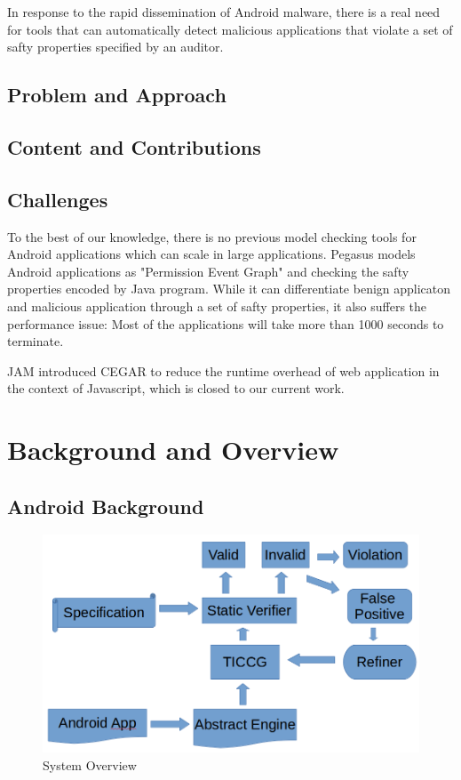 \documentclass{article}
\begin{document}
In response to the  rapid dissemination of 
Android malware, there is  a real need for tools that can automatically
detect malicious applications that violate a set of safty properties 
specified by an auditor.

\subsection{Problem and Approach}
\subsection{Content and Contributions}
\subsection{Challenges}
To the best of our knowledge, there is no previous model checking tools for 
Android applications which can scale in large applications.
Pegasus\cite{pegasus} models Android applications as "Permission Event Graph"
and checking the safty properties encoded by Java program. While it can 
differentiate benign applicaton and malicious application through a set 
of safty properties, it also suffers the performance issue: Most of the 
applications will take more than 1000 seconds to terminate. 

JAM\cite{cegar12} introduced CEGAR to reduce the runtime overhead of web 
application in the context of Javascript, which is closed
to our current work.

\section{Background and Overview}
\label{sec:overview}

\subsection{Android Background}
\begin{figure}
\centerline{\includegraphics[scale=0.4]{sysgraph}}
\caption{System Overview}
\label{fig:one}
\end{figure}
\end{document}

